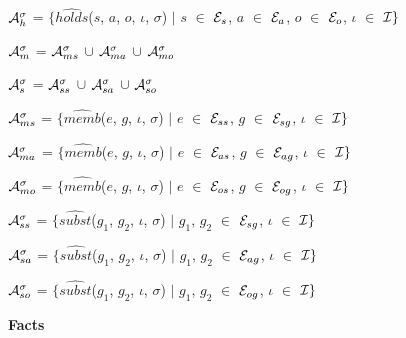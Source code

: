 \documentclass[11pt]{report}
\newenvironment{vquote}
{
  \begin{list}{}{\leftmargin 1em}\item[]
}
{
  \end{list}
}
\begin{document}
\begin{itemize}
              \begin{vquote}
                ${\cal A}^{\sigma}_{h}$ =
                  $\{\hat{holds}$($s$, $a$, $o$, $\iota$, $\sigma$) $\mid$
                  $s$ $\in$ ${\cal E}_{s}$,
                  $a$ $\in$ ${\cal E}_{a}$,
                  $o$ $\in$ ${\cal E}_{o}$,
                  $\iota$ $\in$ ${\cal I}\}$

                ${\cal A}^{\sigma}_{m}$ =
                  ${\cal A}^{\sigma}_{ms}$ $\cup$
                  ${\cal A}^{\sigma}_{ma}$ $\cup$
                  ${\cal A}^{\sigma}_{mo}$

                ${\cal A}^{\sigma}_{s}$ =
                  ${\cal A}^{\sigma}_{ss}$ $\cup$
                  ${\cal A}^{\sigma}_{sa}$ $\cup$
                  ${\cal A}^{\sigma}_{so}$

                ${\cal A}^{\sigma}_{ms}$ =
                  $\{\hat{memb}$($e$, $g$, $\iota$, $\sigma$) $\mid$
                  $e$ $\in$ ${\cal E}_{ss}$,
                  $g$ $\in$ ${\cal E}_{sg}$,
                  $\iota$ $\in$ ${\cal I}\}$

                ${\cal A}^{\sigma}_{ma}$ =
                  $\{\hat{memb}$($e$, $g$, $\iota$, $\sigma$) $\mid$
                  $e$ $\in$ ${\cal E}_{as}$,
                  $g$ $\in$ ${\cal E}_{ag}$,
                  $\iota$ $\in$ ${\cal I}\}$

                ${\cal A}^{\sigma}_{mo}$ =
                  $\{\hat{memb}$($e$, $g$, $\iota$, $\sigma$) $\mid$
                  $e$ $\in$ ${\cal E}_{os}$,
                  $g$ $\in$ ${\cal E}_{og}$,
                  $\iota$ $\in$ ${\cal I}\}$

                ${\cal A}^{\sigma}_{ss}$ =
                  $\{\hat{subst}$($g_{1}$, $g_{2}$, $\iota$, $\sigma$) $\mid$
                  $g_{1}$, $g_{2}$ $\in$ ${\cal E}_{sg}$,
                  $\iota$ $\in$ ${\cal I}\}$

                ${\cal A}^{\sigma}_{sa}$ =
                  $\{\hat{subst}$($g_{1}$, $g_{2}$, $\iota$, $\sigma$) $\mid$
                  $g_{1}$, $g_{2}$ $\in$ ${\cal E}_{ag}$,
                  $\iota$ $\in$ ${\cal I}\}$

                ${\cal A}^{\sigma}_{so}$ =
                  $\{\hat{subst}$($g_{1}$, $g_{2}$, $\iota$, $\sigma$) $\mid$
                  $g_{1}$, $g_{2}$ $\in$ ${\cal E}_{og}$,
                  $\iota$ $\in$ ${\cal I}\}$
              \end{vquote}

            \item
              {\bf Facts}


\end{itemize}
\end{document}
